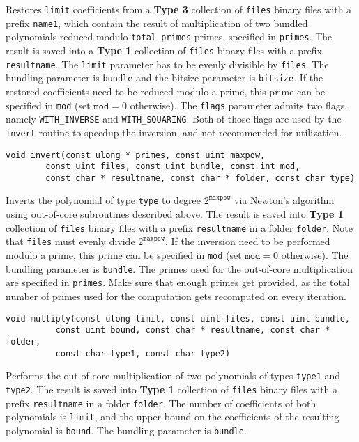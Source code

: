 \documentclass[a4paper,10pt]{article}
\newcommand{\code}{\lstinline}
\begin{document}
Restores \code{limit} coefficients from a \textbf{Type 3} collection of \code{files} binary files with a prefix \code{name1}, which contain the result of multiplication of two bundled polynomials reduced modulo \code{total_primes} primes, specified in \code{primes}. The result is saved into a \textbf{Type 1} collection of \code{files} binary files with a prefix \code{resultname}. The \code{limit} parameter has to be evenly divisible by \code{files}. The bundling parameter is \code{bundle} and the bitsize parameter is \code{bitsize}. If the restored coefficients need to be reduced modulo a prime, this prime can be specified in \code{mod} (set $\texttt{mod} = 0$ otherwise). The \code{flags} parameter admits two flags, namely \code{WITH_INVERSE} and \code{WITH_SQUARING}. Both of those flags are used by the \code{invert} routine to speedup the inversion, and not recommended for utilization.

\begin{lstlisting}
void invert(const ulong * primes, const uint maxpow,
	    const uint files, const uint bundle, const int mod,
	    const char * resultname, const char * folder, const char type)
\end{lstlisting}

Inverts the polynomial of type \code{type} to degree $2^{\texttt{maxpow}}$ via Newton's algorithm using out-of-core subroutines described above. The result is saved into \textbf{Type 1} collection of \texttt{files} binary files with a prefix \code{resultname} in a folder \code{folder}. Note that \code{files} must evenly divide $2^{\texttt{maxpow}}$. If the inversion need to be performed modulo a prime, this prime can be specified in \code{mod} (set $\texttt{mod} = 0$ otherwise). The bundling parameter is \texttt{bundle}. The primes used for the out-of-core multiplication are specified in \code{primes}. Make sure that enough primes get provided, as the total number of primes used for the computation gets recomputed on every iteration.

\begin{lstlisting}
void multiply(const ulong limit, const uint files, const uint bundle,
	      const uint bound, const char * resultname, const char * folder,
	      const char type1, const char type2)
\end{lstlisting}

Performs the out-of-core multiplication of two polynomials of types \code{type1} and \code{type2}. The result is saved into \textbf{Type 1} collection of \texttt{files} binary files with a prefix \code{resultname} in a folder \code{folder}. The number of coefficients of both polynomials is \code{limit}, and the upper bound on the coefficients of the resulting polynomial is \code{bound}. The bundling parameter is \code{bundle}.
\end{document}
